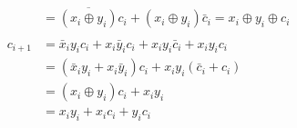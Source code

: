 \documentclass[12pt,openany, tikz,border=10pt]{book}
\newcommand*\xor{\oplus}
\begin{document}
\begin{itemize}
\begin{align*}
			      		      	        & = \overline{(x_i \xor y_i)}c_i + (x_i \xor y_i)\bar{c}_i = x_i \xor y_i \xor c_i           \\
			      		      	\\
			      		      	c_{i+1} & = \bar{x}_i y_i c_i + x_i \bar{y}_i c_i + x_i y_i \bar{c}_i + x_i y_i c_i                  \\
			      		      	        & = (\bar{x}_i y_i + x_i \bar{y}_i)c_i + x_i y_i(\bar{c}_i + c_i)                            \\
			      		      	        & = (x_i \xor y_i)c_i + x_i y_i                                                              \\
			      		      	        & = x_i y_i + x_i c_i + y_i c_i                                                              \\
			      		      \end{align*}
			      		      
			      		       
			      	\end{itemize}
			      	
\end{document}
